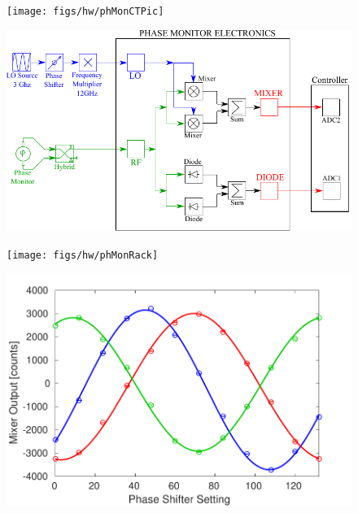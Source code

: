 \documentclass[%
 reprint,
 superscriptaddress,
 amsmath,
 amssymb,
 prstab,
]{revtex4-1}
\begin{document}
\begin{figure}
	\texttt{[image: figs/hw/phMonCTPic]}%
	\caption{\label{f:phMonCTPic}
	}
\end{figure}

\begin{figure}
	\includegraphics[width=\textwidth]{figs/hw/phMonDiagram}%
	\caption{\label{f:phMonDiagram}
	}
\end{figure}

\begin{figure}
	\texttt{[image: figs/hw/phMonRack]}%
	\caption{\label{f:phMonRack}
	}
\end{figure}

\begin{figure}
	\includegraphics[width=\columnwidth]{figs/hw/phMonCal}%
	\caption{\label{f:phMonCal}
	}
\end{figure}
\end{document}
